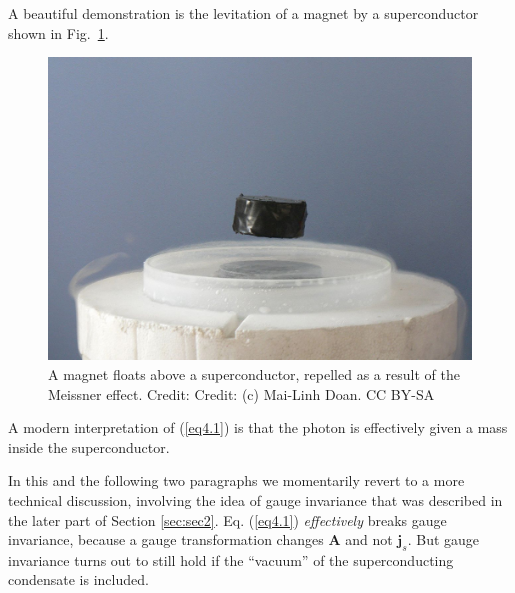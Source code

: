 \documentclass[12pt]{iopart}
\begin{document}
A beautiful demonstration is the levitation of a magnet by a superconductor shown in Fig.~\ref{Fig19-Meissner.eps}.
\begin{figure}[htbp]
\centering
\includegraphics[bb=0 0 360 260, width=5in]{Fig19-Meissner.eps}
\caption{A magnet floats above a superconductor, repelled as a result of the Meissner effect. Credit: Credit: (c) Mai-Linh Doan. CC BY-SA \label{Fig19-Meissner.eps}}
\end{figure}
A modern interpretation of (\ref{eq4.1}) is that the photon is effectively given a mass inside the superconductor. 

In this and the following two paragraphs we momentarily revert to a more technical discussion, involving the idea of gauge invariance that was described in the later part of Section \ref{sec:sec2}. Eq. (\ref{eq4.1}) \textit{effectively} breaks gauge invariance, because a gauge transformation changes $\mathbf{A} $ and not $\mathbf{j}_{s}$.  But gauge invariance turns out to still hold if the ``vacuum'' of the superconducting condensate is included.
\end{document}
